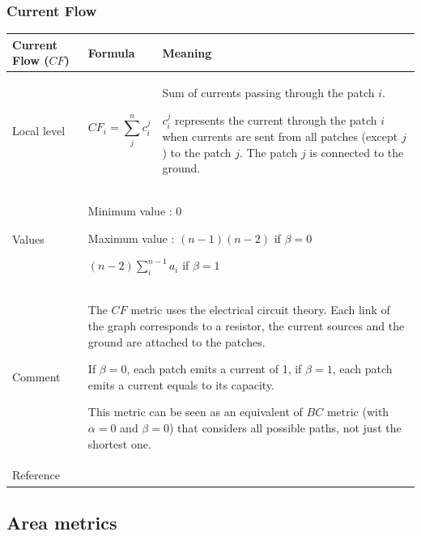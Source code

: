 \documentclass{article}
\begin{document}
\subsubsection{Current Flow}
\label{metric_CF}
\begin{table}[H]
	\begin{tabular}{|m{3.24cm}|m{4.4810004cm}m{7.924cm}|}
		\hline
		Current Flow ($CF$) &
		\multicolumn{1}{m{4.4810004cm}|}{Formula} &
		Meaning\\\hline
		Local level &
		\multicolumn{1}{m{4.4810004cm}|}{
			\begin{equation*}
			CF_{i}=\sum_{j}^n{c_i^j}
			\end{equation*}
		} &
		Sum of currents passing through the patch $i$.
		
		$c_i^j$ represents the current through the patch $i$ when currents are sent from all patches (except $j$) to the patch $j$. The patch $j$ is connected to the ground.
		
		\\\hline
		Values &
		\multicolumn{2}{m{12.6050005cm}|}{			
			Minimum value : 0
			
			Maximum value : $(n-1)(n-2)$ if $\beta=0$
			
			$(n-2)\sum_i^{n-1} a_i$ if $\beta=1$
			
		}\\\hline
		Comment &
		\multicolumn{2}{m{12.6050005cm}|}{
			The $CF$ metric uses the electrical circuit theory. Each link of the graph corresponds to a resistor, the current sources and the ground are attached to the patches.
			
			If $\beta=0$, each patch emits a current of 1, if $\beta=1$, each patch emits a current equals to its capacity.
			
			This metric can be seen as an equivalent of $BC$ metric (with $\alpha=0$ and $\beta=0$) that considers all possible paths, not just the shortest one.
			
		}\\\hline
		Reference &
		\multicolumn{2}{m{12.6050005cm}|}{		
			\cite{2015_collisions}
		}\\\hline
	\end{tabular}
\end{table}

\subsection{Area metrics}
\end{document}
